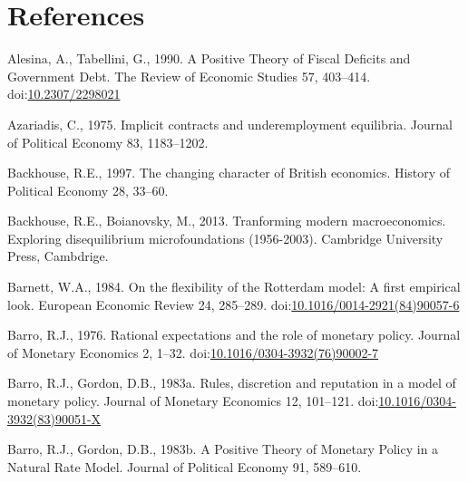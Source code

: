 \documentclass[
  12pt,
  onecolumn]{article}
\newlength{\cslhangindent}
\newlength{\cslentryspacingunit} %
\newenvironment{CSLReferences}[2] %
 {%
  \setlength{\parindent}{0pt}
  \ifodd #1
  \let\oldpar\par
  \def\par{\hangindent=\cslhangindent\oldpar}
  \fi
  \setlength{\parskip}{#2\cslentryspacingunit}
 }%
 {}
\begin{document}
\newpage

\hypertarget{references}{%
\section*{References}\label{references}}

\hypertarget{refs}{}
\begin{CSLReferences}{1}{0}
\leavevmode{}%
Alesina, A., Tabellini, G., 1990. A {Positive Theory} of {Fiscal
Deficits} and {Government Debt}. The Review of Economic Studies 57,
403--414. doi:\href{https://doi.org/10.2307/2298021}{10.2307/2298021}

\leavevmode{}%
Azariadis, C., 1975. Implicit contracts and underemployment equilibria.
Journal of Political Economy 83, 1183--1202.

\leavevmode{}%
Backhouse, R.E., 1997. The changing character of {British} economics.
History of Political Economy 28, 33--60.

\leavevmode{}%
Backhouse, R.E., Boianovsky, M., 2013. Tranforming modern
macroeconomics. {Exploring} disequilibrium microfoundations (1956-2003).
{Cambridge University Press}, {Cambdrige}.

\leavevmode{}%
Barnett, W.A., 1984. On the flexibility of the {Rotterdam} model: {A}
first empirical look. European Economic Review 24, 285--289.
doi:\href{https://doi.org/10.1016/0014-2921(84)90057-6}{10.1016/0014-2921(84)90057-6}

\leavevmode{}%
Barro, R.J., 1976. Rational expectations and the role of monetary
policy. Journal of Monetary Economics 2, 1--32.
doi:\href{https://doi.org/10.1016/0304-3932(76)90002-7}{10.1016/0304-3932(76)90002-7}

\leavevmode{}%
Barro, R.J., Gordon, D.B., 1983a. Rules, discretion and reputation in a
model of monetary policy. Journal of Monetary Economics 12, 101--121.
doi:\href{https://doi.org/10.1016/0304-3932(83)90051-X}{10.1016/0304-3932(83)90051-X}

\leavevmode{}%
Barro, R.J., Gordon, D.B., 1983b. A {Positive Theory} of {Monetary
Policy} in a {Natural Rate Model}. Journal of Political Economy 91,
589--610.


\end{CSLReferences}
\end{document}
